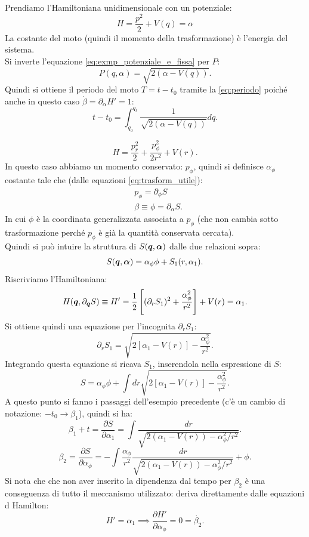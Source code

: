 \noindent
\begin{exmp}
    Prendiamo l'Hamiltoniana unidimensionale con un potenziale:
    \begin{equation}
	H = \frac{p^2}{2} + V(q) = \alpha
	\label{eq:exmp_potenziale_e_fissa}
    \end{equation}
    La costante del moto (quindi il momento della trasformazione) è l'energia del sistema.\\
    Si inverte l'equazione \ref{eq:exmp_potenziale_e_fissa} per $P$:
    \[
	P(q,\alpha) = \sqrt{2(\alpha-V(q))} 
    .\] 
    Quindi si ottiene il periodo del moto $T = t-t_0$ tramite la \ref{eq:periodo} poiché anche in questo caso $\dot{\beta } = \partial_\alpha  H' = 1$:
    \[
	t-t_0 = \int_{q_0}^{q_t} \frac{1}{\sqrt{2(\alpha-V(q))}}dq 
    .\] 
\end{exmp}
\noindent
\begin{exmp}
    \[
	H = \frac{p^2_r}{2} + \frac{p_\phi^2}{2r^2} + V(r) 
    .\] 
In questo caso abbiamo un momento conservato: $p_\phi$, quindi si definisce $\alpha_\phi$ costante tale che (dalle equazioni \ref{eq:trasform_utile}):
    \[\begin{aligned}
	&p_\phi  = \partial_\phi  S \\
	&\beta \equiv \phi  = \partial_\alpha  S
    .\end{aligned}\]
    In cui $\phi$ è la coordinata generalizzata associata a $p_\phi$ (che non cambia sotto trasformazione perché $p_\phi$ è già la quantità conservata cercata).\\
    Quindi si può intuire la struttura di $S(\boldsymbol{q}, \boldsymbol{\alpha })$ dalle due relazioni sopra:
    \[
	S(\boldsymbol{q}, \boldsymbol{\alpha}) = \alpha_\phi\phi  + S_1(r, \alpha_1) 
    .\] 
    Riscriviamo l'Hamiltoniana:
    \[
	H(\boldsymbol{q}, \partial_{\boldsymbol{q}} S) \equiv H' = \frac{1}{2}\left[(\partial_{r}S_1)^2 + \frac{\alpha_\phi^2}{r^2}\right] + V(r) = \alpha_1
    .\] 
    Si ottiene quindi una equazione per l'incognita $\partial_{r}S_1$:
    \[
	\partial_{r}S_1 = \sqrt{2\left[\alpha_1 - V(r) \right]- \frac{\alpha_\phi^2}{r^2}} 
    .\] 
    Integrando questa equazione si ricava $S_1$, inserendola nella espressione di $S$:
    \[
        S = \alpha_\phi\phi  + \int dr \sqrt{2\left[\alpha_1 - V(r) \right]- \frac{\alpha_\phi^2}{r^2}} 
    .\] 
    A questo punto si fanno i passaggi dell'esempio precedente (c'è un cambio di notazione: $-t_0\to \beta_1$), quindi si ha:
    \[
	\beta_1 + t = \frac{\partial S}{\partial \alpha_1} = \int  \frac{dr}{\sqrt{2(\alpha_1-V(r))- \alpha^2_\phi  /r^2}}
    .\] 
    \[
	\beta_2 = \frac{\partial S}{\partial \alpha_\phi} = 
	-\int \frac{\alpha_\phi}{r^2} \frac{dr}{\sqrt{2(\alpha_1-V(r))- \alpha^2_\phi  /r^2}} + \phi
    .\] 
    Si nota che che non aver inserito la dipendenza dal tempo per $\beta_2$ è una conseguenza di tutto il meccanismo utilizzato: deriva direttamente dalle equazioni d Hamilton:
    \[
        H' = \alpha_1 \implies  \frac{\partial H'}{\partial \alpha_\phi} = 0 = \dot{\beta_2}
    .\] 
\end{exmp}
\noindent
